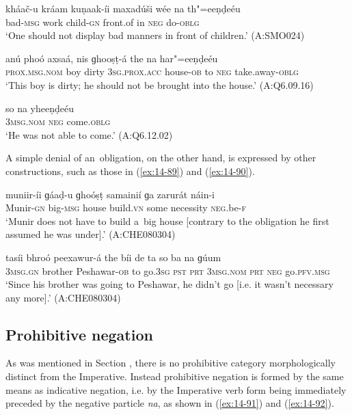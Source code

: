 \begin{exe}
\ex
\label{ex:14-86}
\gll kháač-u kráam kuṇaak-íi maxadúši wée na  th"=eeṇḍeéu \\
bad-\textsc{msg} work child-\textsc{gn} front.of in \textsc{neg} do-\textsc{oblg } \\
\glt `One should not display bad manners in front of children.' (A:SMO024)

\ex
\label{ex:14-87}
\gll anú phoó axsaá, nis ɡhooṣṭ-á  the na har"=eeṇḍeéu \\
\textsc{prox.msg.nom} boy dirty \textsc{3sg.prox.acc} house-\textsc{ob}  to \textsc{neg} take.away-\textsc{oblg } \\
\glt `This boy is dirty; he should not be brought into the house.' (A:Q6.09.16)

\ex
\label{ex:14-88}
\gll so na yheeṇḍeéu \\
\textsc{3msg}.\textsc{nom} \textsc{neg} come.\textsc{oblg}  \\
\glt `He was not able to come.' (A:Q6.12.02)
\end{exe}

A simple denial of an~obligation, on the other hand, is expressed by other constructions, such as those in (\ref{ex:14-89}) and (\ref{ex:14-90}).

\begin{exe}
\ex
\label{ex:14-89}
\gll muniir-íi ɡáaḍ-u ɡhoóṣṭ samainií ɡa zarurát  náin-i \\
Munir-\textsc{gn} big-\textsc{msg} house build.\textsc{vn} some necessity  \textsc{neg.}be-\textsc{f } \\
\glt `Munir does not have to build a~big house [contrary to the obligation he first assumed he was under].' (A:CHE080304)

\ex
\label{ex:14-90}
\gll tasíi bhroó peexawur-á the bíi de ta  so ba na ɡúum \\
\textsc{3msg}.\textsc{gn} brother Peshawar-\textsc{ob} to go.\textsc{3sg} \textsc{pst} \textsc{prt}  \textsc{3msg.nom} \textsc{prt} \textsc{neg} go.\textsc{pfv.msg } \\
\glt `Since his brother was going to Peshawar, he didn't go [i.e. it wasn't necessary any more].' (A:CHE080304)
\end{exe}

\subsection{Prohibitive negation}
\label{subsec:14-3-5}


As was mentioned in Section , there is no prohibitive category morphologically distinct from the Imperative. Instead prohibitive negation is formed by the same means as indicative negation, i.e. by the Imperative verb form being immediately preceded by the negative particle \textit{na}, as shown in (\ref{ex:14-91}) and (\ref{ex:14-92}).

